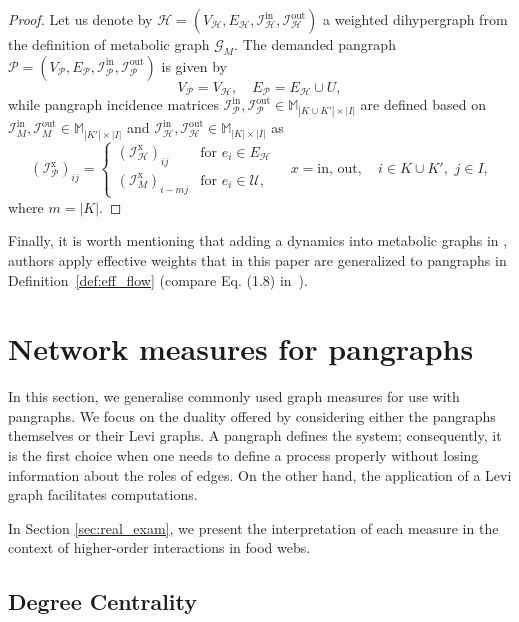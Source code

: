 \documentclass[a4paper,12pt]{article}
\theoremstyle{definition}
\theoremstyle{remark}
\newcommand{\mG}{\mathcal{G}}
\newcommand{\mH}{\mathcal{H}}
\newcommand{\mP}{\mathcal{P}}
\newcommand{\EH}{E_{\mathcal{H}}}
\newcommand{\EP}{E_{\mathcal{P}}}
\newcommand{\tin}{\mathrm{in}}
\newcommand{\out}{\mathrm{out}}
\newcommand{\inci}{\mathcal{I}^{\tin}}
\newcommand{\incip}{\mathcal{I}^{\tin}_{\mP}}
\newcommand{\inco}{\mathcal{I}^{\out}}
\newcommand{\incop}{\mathcal{I}^{\out}_{\mP}}
\begin{document}
\begin{proof} 
Let us denote by $\mH= (V_{\mH},\EH, \inci_{\mH},\inco_{\mH})$ a weighted dihypergraph from the definition of metabolic graph $\mG_{M}$. The demanded pangraph $\mP= (V_{\mP},\EP, \incip,\incop)$ is given by
\begin{equation*}
    V_{\mP}=V_{\mH},\quad E_{\mP}=E_{\mH}\cup U, 
\end{equation*}
while pangraph incidence matrices $\inci_{\mP},\inco_{\mP}\in \mathbb{M}_{|K\cup K'|\times |I|}$ are defined based on $\inci_M,\inco_M\in \mathbb{M}_{|K'|\times |I|}$ and $\inci_{\mH},\inco_{\mH}\in \mathbb{M}_{|K|\times |I|}$ as
\begin{equation}
(\mathcal{I}^{\textrm{x}}_{\mathcal{P}})_{ij}=\left\{\begin{array}{ll}
(\mathcal{I}^{\textrm{x}}_{\mathcal{H}})_{ij}&\textrm{for }e_i\in E_{\mH}\\ [.2cm]
(\mathcal{I}^{\textrm{x}}_{M})_{i-m j}&\textrm{for }e_i\in \mathcal{U},
\end{array}
\right.\quad x=\textrm{in, out},\quad  i\in K\cup K',\,\,j\in I,
\end{equation}
where $m=|K|$.
\end{proof}

Finally, it is worth mentioning that adding a dynamics into metabolic graphs in \cite{Metabolic_graphs_McQuade}, authors apply effective weights that in this paper are generalized to pangraphs in Definition~\ref{def:eff_flow} (compare Eq. (1.8) in~\cite{Metabolic_graphs_McQuade}).



\section{Network measures for pangraphs}\label{sec:measures}

In this section, we generalise commonly used graph measures for use with pangraphs. We focus on the duality offered by considering either the pangraphs themselves or their Levi graphs. A pangraph defines the system; consequently, it is the first choice when one needs to define a process properly without losing information about the roles of edges. On the other hand, the application of a Levi graph facilitates computations. 

In Section \ref{sec:real_exam}, we present the interpretation of each measure in the context of higher-order interactions in food webs.

\subsection{Degree Centrality}\label{subsec:deg_central}
\end{document}
